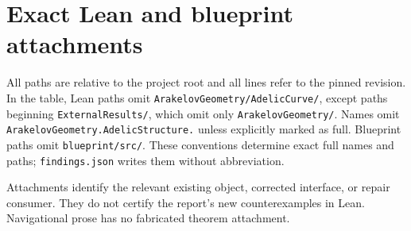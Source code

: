 \documentclass[11pt,a4paper]{article}
\newcommand{\code}[1]{{\small\nolinkurl{#1}}}
\begin{document}
\clearpage
\appendix
\section{Exact Lean and blueprint attachments}
All paths are relative to the project root and all lines refer to the pinned revision.
In the table, Lean paths omit \code{ArakelovGeometry/AdelicCurve/}, except paths beginning \code{ExternalResults/}, which omit only \code{ArakelovGeometry/}. Names omit \code{ArakelovGeometry.AdelicStructure.} unless explicitly marked as full.
Blueprint paths omit \code{blueprint/src/}. These conventions determine exact full names and paths; \code{findings.json} writes them without abbreviation.

Attachments identify the relevant existing object, corrected interface, or repair consumer. They do not certify the report's new counterexamples in Lean. Navigational prose has no fabricated theorem attachment.
\end{document}
